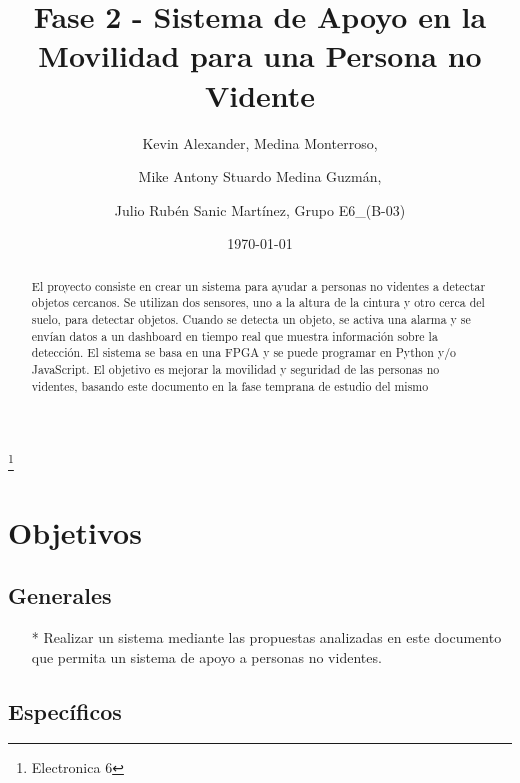 \documentclass[osajnl,twocolumn,showpacs,superscriptaddress,10pt]{revtex4-1}
\begin{document}
\title{Fase 2 -  Sistema de Apoyo en la
Movilidad para una Persona no Vidente}
\thanks{Electronica 6}

\author{Kevin Alexander, Medina Monterroso,}
\author{Mike Antony Stuardo Medina Guzmán, }
\author{Julio Rubén Sanic Martínez, Grupo E6\_(B-03) }


%


\date{\today}%

\maketitle{}
\begin{abstract}
El proyecto consiste en crear un sistema para ayudar a personas no videntes a detectar objetos cercanos. Se utilizan dos sensores, uno a la altura de la cintura y otro cerca del suelo, para detectar objetos. Cuando se detecta un objeto, se activa una alarma y se envían datos a un dashboard en tiempo real que muestra información sobre la detección. El sistema se basa en una FPGA y se puede programar en Python y/o JavaScript. El objetivo es mejorar la movilidad y seguridad de las personas no videntes, basando este documento en la fase temprana de estudio del mismo
\end{abstract}


\section{Objetivos}

\subsection{Generales}

\begin{itemize}
\item[*] Realizar un sistema mediante las propuestas analizadas en este documento que permita un sistema de apoyo a personas no videntes.
\end{itemize}

\subsection{Específicos}
\end{document}

